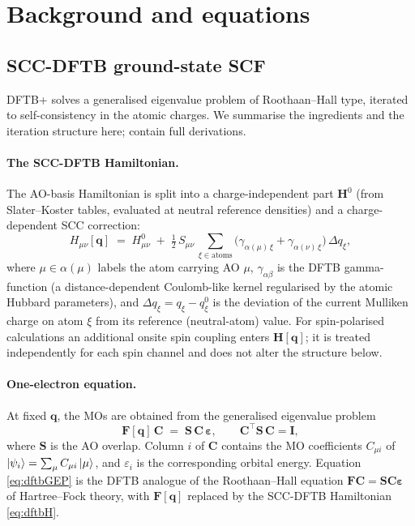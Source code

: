 \documentclass[11pt,a4paper]{article}
\newcommand{\HH}{\mathbf{H}}
\newcommand{\FF}{\mathbf{F}}
\newcommand{\CC}{\mathbf{C}}
\newcommand{\II}{\mathbf{I}}
\newcommand{\SS}{\mathbf{S}}
\newcommand{\qq}{\mathbf{q}}
\begin{document}
\section{Background and equations}\label{sec:background}

\subsection{SCC-DFTB ground-state SCF}

DFTB+ solves a generalised eigenvalue problem of Roothaan--Hall type,
iterated to self-consistency in the atomic charges. We summarise the
ingredients and the iteration structure here; \cite{Elstner1998,DFTBplus}
contain full derivations.

\paragraph{The SCC-DFTB Hamiltonian.}
The AO-basis Hamiltonian is split into a charge-independent part
$\mathbf{H}^{0}$ (from Slater--Koster tables, evaluated at neutral
reference densities) and a charge-dependent SCC correction:
\begin{equation}
H_{\mu\nu}[\qq] \;=\; H^{0}_{\mu\nu}
    \;+\; \tfrac12\, S_{\mu\nu}\, \sum_{\xi\in\text{atoms}}
     \big(\gamma_{\alpha(\mu)\,\xi} + \gamma_{\alpha(\nu)\,\xi}\big)\,
     \Delta q_\xi,
\label{eq:dftbH}
\end{equation}
where $\mu\in\alpha(\mu)$ labels the atom carrying AO $\mu$,
$\gamma_{\alpha\beta}$ is the DFTB gamma-function (a
distance-dependent Coulomb-like kernel regularised by the atomic
Hubbard parameters), and $\Delta q_\xi = q_\xi - q_\xi^{0}$ is the
deviation of the current Mulliken charge on atom $\xi$ from its
reference (neutral-atom) value. For spin-polarised calculations an
additional onsite spin coupling enters $\HH[\qq]$; it is treated
independently for each spin channel and does not alter the structure
below.

\paragraph{One-electron equation.}
At fixed $\qq$, the MOs are obtained from the generalised eigenvalue
problem
\begin{equation}
\FF[\qq]\,\CC \;=\; \SS\,\CC\,\bm{\varepsilon},\qquad
\CC^{\top}\SS\,\CC = \II,
\label{eq:dftbGEP}
\end{equation}
where $\SS$ is the AO overlap. Column $i$ of $\CC$ contains the MO
coefficients $C_{\mu i}$ of $\ket{\psi_i}=\sum_\mu C_{\mu i}\ket{\mu}$,
and $\varepsilon_i$ is the corresponding orbital energy. Equation
\eqref{eq:dftbGEP} is the DFTB analogue of the Roothaan--Hall equation
$\mathbf{F}\mathbf{C}=\mathbf{S}\mathbf{C}\bm{\varepsilon}$ of
Hartree--Fock theory, with $\mathbf{F}[\qq]$ replaced by the SCC-DFTB
Hamiltonian \eqref{eq:dftbH}.
\end{document}
